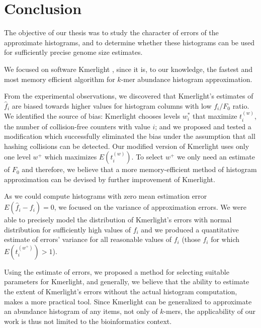 \chapter*{Conclusion}

The objective of our thesis was to study the character of errors
of the approximate histograms, and to determine whether these histograms
can be used for sufficiently precise genome size estimates.

\medskip
We focused on software Kmerlight \cite{Sivadasan2016}, since it 
is, to our knowledge, the fastest and most memory efficient algorithm for
$k$-mer abundance histogram approximation. 

From the experimental observations, we discovered that Kmerlight's estimates 
of $\hat f_i$ are biased towards higher values for histogram columns
with low $f_i / F_0$ ratio. We identified the source of bias: Kmerlight
chooses levels $w_i^*$ that maximize $t_i^{(w)}$, the number of collision-free
counters with value $i$; and we proposed and tested a modification which successfully
eliminated the bias under the assumption that all hashing collisions can be detected. 
Our modified version of Kmerlight uses only one level $w^+$ which
maximizes $E(t_i^{(w)})$. To select $w^+$ we only need an estimate of $F_0$ and therefore,
we believe that a more memory-efficient method of histogram approximation can be devised by
further improvement of Kmerlight. 

As we could compute histograms with zero mean estimation error $E(\hat f_i - f_i) = 0$,
we focused on the variance of approximation errors. We were able to precisely model the
distribution of Kmerlight's errors with normal distribution for sufficiently high values of
$f_i$ and we produced a quantitative estimate of errors' variance for all reasonable values of $f_i$
(those $f_i$ for which $E(t_i^{(w^+)}) > 1$). 

Using the estimate of errors, we proposed a method
for selecting suitable parameters for Kmerlight, and generally, we believe that the 
ability to estimate the extent of Kmerlight's errors without the actual histogram computation, 
makes a more practical tool.
Since Kmerlight can be generalized to approximate an abundance histogram of any items,
not only of $k$-mers, the applicability of our work is thus not limited to the
bioinformatics context. 


